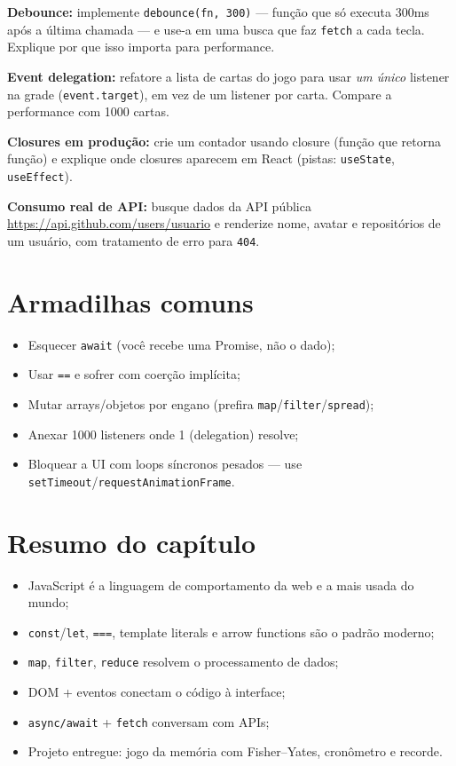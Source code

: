 \begin{seniores}
  \item \textbf{Debounce:} implemente \texttt{debounce(fn, 300)} — função que
  só executa 300ms após a última chamada — e use-a em uma busca que faz
  \texttt{fetch} a cada tecla. Explique por que isso importa para performance.
  \item \textbf{Event delegation:} refatore a lista de cartas do jogo para usar
  \emph{um único} listener na grade (\texttt{event.target}), em vez de um
  listener por carta. Compare a performance com 1000 cartas.
  \item \textbf{Closures em produção:} crie um contador usando closure (função
  que retorna função) e explique onde closures aparecem em React (pistas:
  \texttt{useState}, \texttt{useEffect}).
  \item \textbf{Consumo real de API:} busque dados da API pública
  \url{https://api.github.com/users/usuario} e renderize nome, avatar e
  repositórios de um usuário, com tratamento de erro para \texttt{404}.
\end{seniores}

\section{Armadilhas comuns}

\begin{itemize}[leftmargin=*, itemsep=0.4em]
  \item Esquecer \texttt{await} (você recebe uma Promise, não o dado);
  \item Usar \texttt{==} e sofrer com coerção implícita;
  \item Mutar arrays/objetos por engano (prefira \texttt{map}/\texttt{filter}/\texttt{spread});
  \item Anexar 1000 listeners onde 1 (delegation) resolve;
  \item Bloquear a UI com loops síncronos pesados — use \texttt{setTimeout}/\texttt{requestAnimationFrame}.
\end{itemize}

\section{Resumo do capítulo}

\begin{itemize}[leftmargin=*, itemsep=0.3em]
  \item JavaScript é a linguagem de comportamento da web e a mais usada do mundo;
  \item \texttt{const}/\texttt{let}, \texttt{===}, template literals e arrow functions são o padrão moderno;
  \item \texttt{map}, \texttt{filter}, \texttt{reduce} resolvem o processamento de dados;
  \item DOM + eventos conectam o código à interface;
  \item \texttt{async/await} + \texttt{fetch} conversam com APIs;
  \item Projeto entregue: jogo da memória com Fisher--Yates, cronômetro e recorde.
\end{itemize}

